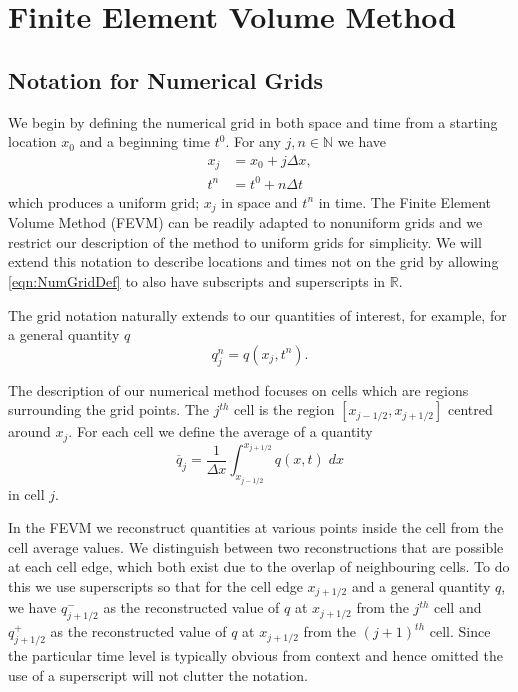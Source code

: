 
\chapter{Finite Element Volume Method}
\label{chp:HFVMMethod}

\section{Notation for Numerical Grids}
We begin by defining the numerical grid in both space and time from a starting location $x_0$ and a beginning time $t^0$. For any $j,n \in \mathbb{N}$ we have
\begin{subequations}
\begin{align}
x_j &= x_0 + j \Delta x,  \\
t^n &= t^0 + n \Delta t
\end{align}
\label{eqn:NumGridDef}
\end{subequations}
which produces a uniform grid; $x_j$ in space and $t^n$ in time. The Finite Element Volume Method (FEVM) can be readily adapted to nonuniform grids and we restrict our description of the method to uniform grids for simplicity. We will extend this notation to describe locations and times not on the grid by allowing \eqref{eqn:NumGridDef} to also have subscripts and superscripts in $\mathbb{R}$. 

The grid notation naturally extends to our quantities of interest, for example, for a general quantity $q$
\begin{equation}
q^n_j = q(x_j ,t^n). 
\end{equation}

The description of our numerical method focuses on cells which are regions surrounding the grid points. The $j^{th}$ cell is the region $\left[x_{j - 1/2} , x_{j + 1/2}\right]$ centred around $x_j$. For each cell we define the average of a quantity
\begin{equation}
\overline{q}_j = \frac{1}{\Delta x} \int_{x_{j-1/2}}^{x_{j+1/2}} q(x,t) \; dx
\end{equation}
in cell $j$.

In the FEVM we reconstruct quantities at various points inside the cell from the cell average values. We distinguish between two reconstructions that are possible at each cell edge, which both exist due to the overlap of neighbouring cells. To do this we use superscripts so that for the cell edge $x_{j+1/2}$ and a general quantity $q$, we have $q^-_{j+1/2}$ as the reconstructed value of $q$ at $x_{j+1/2}$ from the $j^{th}$ cell and $q^+_{j+1/2}$ as the reconstructed value of $q$ at $x_{j+1/2}$ from the $(j+1)^{th}$ cell. Since the particular time level is typically obvious from context and hence omitted the use of a superscript will not clutter the notation.

